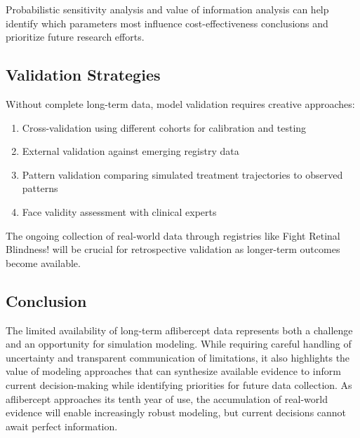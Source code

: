 Probabilistic sensitivity analysis and value of information analysis can help identify which parameters most influence cost-effectiveness conclusions and prioritize future research efforts.

\subsection{Validation Strategies}

Without complete long-term data, model validation requires creative approaches:

\begin{enumerate}
    \item Cross-validation using different cohorts for calibration and testing
    \item External validation against emerging registry data
    \item Pattern validation comparing simulated treatment trajectories to observed patterns
    \item Face validity assessment with clinical experts
\end{enumerate}

The ongoing collection of real-world data through registries like Fight Retinal Blindness! will be crucial for retrospective validation as longer-term outcomes become available.

\subsection{Conclusion}

The limited availability of long-term aflibercept data represents both a challenge and an opportunity for simulation modeling. While requiring careful handling of uncertainty and transparent communication of limitations, it also highlights the value of modeling approaches that can synthesize available evidence to inform current decision-making while identifying priorities for future data collection. As aflibercept approaches its tenth year of use, the accumulation of real-world evidence will enable increasingly robust modeling, but current decisions cannot await perfect information.